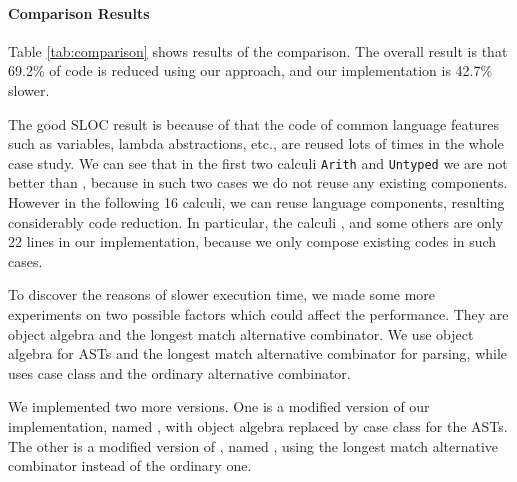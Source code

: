 \paragraph{Comparison Results}
Table \ref{tab:comparison} shows results of the comparison.
The overall result is that 69.2\% of code is reduced using our
approach, and our implementation is 42.7\% slower.

The good SLOC result is because of that the code of common language features
such as variables, lambda abstractions, etc., are reused lots of times in
the whole case study. We can see that in the first two calculi
\lstinline{Arith} and \lstinline{Untyped} we are not better than \ilyaimpl{}, because in such two cases we do not reuse any existing
components. However in the following 16 calculi, we can reuse
language components, resulting considerably code reduction. In particular,
the calculi ,  and some others are only 22 lines
in our implementation, because we only compose existing codes in such cases.

To discover the reasons of slower execution time, we made some more experiments
on two possible factors which could affect the performance.
They are object algebra and the longest match alternative combinator.
We use object algebra for ASTs and the longest match alternative combinator \inlinecode{|||} for parsing,
while \ilyaimpl{} uses case class and the ordinary alternative combinator.

We implemented two more versions. One is a modified version of our implementation, named \ourclass{}, with object algebra replaced by case class for the ASTs.
The other is a modified version of \ilyaimpl{}, named \ilyalongest{}, using the longest match alternative combinator instead of the ordinary one.

